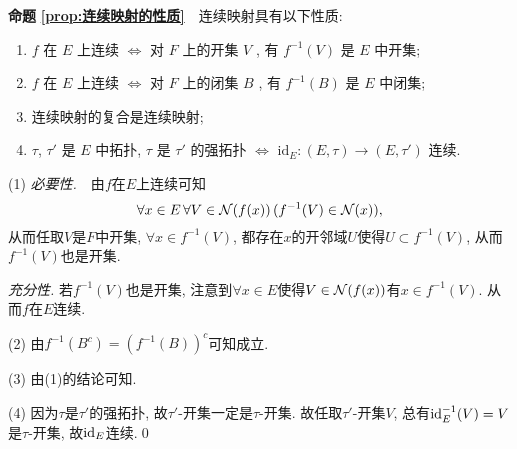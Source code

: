     \textbf{命题\,\,\ref{prop:连续映射的性质}}\ \ 连续映射具有以下性质:
        \begin{enumerate}[(1)]
        \item $ f $ 在 $ E $ 上连续 $ \Longleftrightarrow $ 对 $ F $ 上的开集 $ V $ , 有 $ f^{-1}(V) $ 是 $ E $ 中开集;
        \item $ f $ 在 $ E $ 上连续 $ \Longleftrightarrow $ 对 $ F $ 上的闭集 $ B $ , 有 $ f^{-1}(B) $ 是 $ E $ 中闭集;
        \item 连续映射的复合是连续映射;
        \item $ \tau $, $ \tau' $ 是 $ E $ 中拓扑,  $ \tau $ 是 $ \tau' $ 的强拓扑 $ \Longleftrightarrow $ $ \mathrm{id}_{E}:(E, \tau)\to(E, \tau') $ 连续. 
        \end{enumerate}
    \begin{Proof}
    (1) \textsl{必要性.}\ \ 由$ f $在$ E $上连续可知
    \[
    \forall x\in E\,\forall V\in\mathcal{N}(f(x))\,(f^{-1}(V)\in\mathcal{N}(x)),
    \]
    从而任取$ V $是$ F $中开集, $ \forall x\in f^{-1}(V) $, 都存在$ x $的开邻域$ U $使得$ U\subset f^{-1}(V) $, 从而$ f^{-1}(V) $也是开集.
    
    \textsl{充分性.} 若$ f^{-1}(V) $也是开集, 注意到$ \forall x\in E $使得$ V\in\mathcal{N}(f(x)) $有$ x\in f^{-1}(V) $. 从而$ f $在$ E $连续.
    
    (2) 由$ f^{-1}(B^c)=(f^{-1}(B))^c $可知成立.
    
    (3) 由(1)的结论可知.
    
    (4) 因为$ \tau $是$ \tau' $的强拓扑, 故$ \tau' $-开集一定是$ \tau $-开集. 故任取$ \tau' $-开集$ V $, 总有$ \mathrm{id}_E^{-1}(V)=V $是$ \tau $-开集, 故$ \mathrm{id}_E $连续.\qed
    \end{Proof}
    
